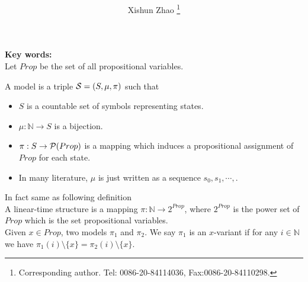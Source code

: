 \documentclass[12pt]{article}
\begin{document}
\title{
}

\author{
Xishun Zhao \footnote{Corresponding author. Tel: 0086-20-84114036,
Fax:0086-20-84110298.}
}





\maketitle

\begin{abstract}

\end{abstract}

{\bf Key words:} \\

Let $Prop$ be the set of all propositional variables.
\vskip 2mm

A model
is a triple
${\cal S}=(S,\mu,\pi)$ such that
\begin{itemize}
\item $S$ is a countable set of symbols representing states.
\item $\mu: \mathbb{N}\rightarrow S$ is a bijection.
\item $\pi: S\rightarrow {\cal P}(Prop)$ is a mapping which induces a propositional assignment of $Prop$ for each state.
\item In many literature, $\mu$ is just written as a sequence $s_0,s_1,\cdots,$.
\end{itemize}


In fact same as following definition\\

A linear-time structure is a mapping $\pi:\mathbb{N}\rightarrow 2^{Prop}$, where $2^{Prop}$ is the power set of $Prop$ which is the set propositional variables. \\

Given $x\in Prop$, two models $\pi_1$ and $\pi_2$. We say $\pi_1$ is an $x$-variant if for any $i\in\mathbb{N}$ we have $\pi_1(i)\setminus\{x\}=\pi_2(i)\setminus\{x\}$.
\end{document}
